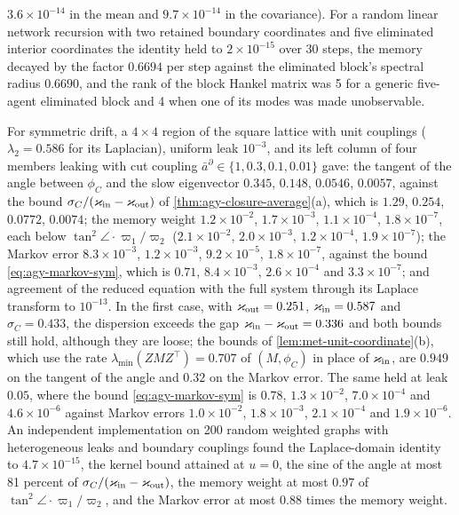 \begin{numcheck}
$3.6\times10^{-14}$ in the mean and $9.7\times10^{-14}$ in the covariance). For a random linear network recursion with two retained boundary coordinates and five eliminated interior coordinates the identity held to $2\times10^{-15}$ over 30 steps, the memory decayed by the factor $0.6694$ per step against the eliminated block's spectral radius $0.6690$, and the rank of the block Hankel matrix was 5 for a generic five-agent eliminated block and 4 when one of its modes was made unobservable.
\end{numcheck}

\begin{numcheck}\label{chk:agy-closure-average}
For symmetric drift, a $4\times4$ region of the square lattice with unit couplings ($\lambda_2=0.586$ for its Laplacian), uniform leak $10^{-3}$, and its left column of four members leaking with cut coupling $\bar a^\partial\in\{1,0.3,0.1,0.01\}$ gave: the tangent of the angle between $\phi_C$ and the slow eigenvector $0.345$, $0.148$, $0.0546$, $0.0057$, against the bound $\sigma_C/(\varkappa_{\mathrm{in}}-\varkappa_{\mathrm{out}})$ of \cref{thm:agy-closure-average}(a), which is $1.29$, $0.254$, $0.0772$, $0.0074$; the memory weight $1.2\times10^{-2}$, $1.7\times10^{-3}$, $1.1\times10^{-4}$, $1.8\times10^{-7}$, each below $\tan^2\angle\cdot\varpi_1/\varpi_2$ ($2.1\times10^{-2}$, $2.0\times10^{-3}$, $1.2\times10^{-4}$, $1.9\times10^{-7}$); the Markov error $8.3\times10^{-3}$, $1.2\times10^{-3}$, $9.2\times10^{-5}$, $1.8\times10^{-7}$, against the bound \eqref{eq:agy-markov-sym}, which is $0.71$, $8.4\times10^{-3}$, $2.6\times10^{-4}$ and $3.3\times10^{-7}$; and agreement of the reduced equation with the full system through its Laplace transform to $10^{-13}$. In the first case, with $\varkappa_{\mathrm{out}}=0.251$, $\varkappa_{\mathrm{in}}=0.587$ and $\sigma_C=0.433$, the dispersion exceeds the gap $\varkappa_{\mathrm{in}}-\varkappa_{\mathrm{out}}=0.336$ and both bounds still hold, although they are loose; the bounds of \cref{lem:met-unit-coordinate}(b), which use the rate $\lambda_{\min}(ZMZ^\top)=0.707$ of $(M,\phi_C)$ in place of $\varkappa_{\mathrm{in}}$, are $0.949$ on the tangent of the angle and $0.32$ on the Markov error. The same held at leak $0.05$, where the bound \eqref{eq:agy-markov-sym} is $0.78$, $1.3\times10^{-2}$, $7.0\times10^{-4}$ and $4.6\times10^{-6}$ against Markov errors $1.0\times10^{-2}$, $1.8\times10^{-3}$, $2.1\times10^{-4}$ and $1.9\times10^{-6}$. An independent implementation on 200 random weighted graphs with heterogeneous leaks and boundary couplings found the Laplace-domain identity to $4.7\times10^{-15}$, the kernel bound attained at $u=0$, the sine of the angle at most 81 percent of $\sigma_C/(\varkappa_{\mathrm{in}}-\varkappa_{\mathrm{out}})$, the memory weight at most $0.97$ of $\tan^2\angle\cdot\varpi_1/\varpi_2$, and the Markov error at most $0.88$ times the memory weight.


\end{numcheck}
